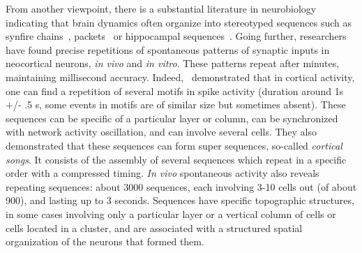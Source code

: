 \documentclass[brainsci, %
               review,submit,pdftex,moreauthors
               ]{Definitions/mdpi}
\begin{document}
From another viewpoint, there is a substantial literature in neurobiology indicating that brain dynamics often organize into stereotyped sequences such as synfire chains~\citep{ikegaya_synfire_2004}, packets~\citep{luczak_sequential_2007} or hippocampal sequences~\citep{pastalkova_internally_2008}. %
Going further, researchers have found precise repetitions of spontaneous patterns of synaptic inputs in neocortical neurons, \emph{in vivo} and \emph{in vitro}. These patterns repeat after minutes, maintaining millisecond accuracy. Indeed,~\citet{ikegaya_synfire_2004} demonstrated that in cortical activity, one can find a repetition of several motifs in spike activity (duration around 1s +/- .5 s, some events in motifs are of similar size but sometimes absent). These sequences can be specific of a particular layer or column, can be synchronized with network activity oscillation, and can involve several cells. They also demonstrated that these sequences can form super sequences, so-called \emph{cortical songs}. It consists of the assembly of several sequences which repeat in a specific order with a compressed timing. \emph{In vivo} spontaneous activity also reveals repeating sequences: about 3000 sequences, each involving 3-10 cells out (of about 900), and lasting up to 3 seconds. Sequences have specific topographic structures, in some cases involving only a particular layer or a vertical column of cells or cells located in a cluster, and are associated with a structured spatial organization of the neurons that formed them. %
\end{document}
